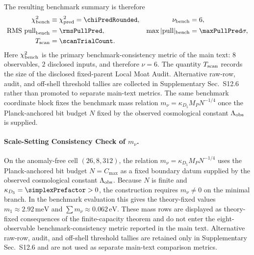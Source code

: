 \documentclass[11pt]{article}
\begin{document}
The resulting benchmark summary is therefore
\begin{align}
 \chi_{\rm bench}^2&\equiv\chi_{\rm pred}^2=\chiPredRounded,
 &\nu_{\rm bench}&=6, \\
 \mathrm{RMS\ pull}_{\rm bench}&=\rmsPullPred,
 &\max |\mathrm{pull}|_{\rm bench}&=\maxPullPred\sigma, \\
 T_{\rm scan}&=\scanTrialCount.
\end{align}
Here $\chi_{\rm bench}^2$ is the primary benchmark-consistency metric of the main text: $8$ observables, $2$ disclosed inputs, and therefore $\nu=6$. The quantity $T_{\rm scan}$ records the size of the disclosed fixed-parent Local Moat Audit. Alternative raw-row, audit, and off-shell threshold tallies are collected in Supplementary Sec.~S12.6 rather than promoted to separate main-text metrics.
The same benchmark coordinate block fixes the benchmark mass relation $m_\nu=\kappa_{D_5}M_PN^{-1/4}$ once the Planck-anchored bit budget $N$ fixed by the observed cosmological constant $\Lambda_{\rm obs}$ is supplied.

\paragraph{Scale-Setting Consistency Check of $m_\nu$.} On the anomaly-free cell $(26,8,312)$, the relation $m_\nu=\kappa_{D_5}M_PN^{-1/4}$ uses the Planck-anchored bit budget $N=C_{\max}$ as a fixed boundary datum supplied by the observed cosmological constant $\Lambda_{\rm obs}$. Because $N$ is finite and $\kappa_{D_5}=\simplexPrefactor>0$, the construction requires $m_\nu\neq0$ on the minimal branch. In the benchmark evaluation this gives the theory-fixed values $m_1\approx2.92\,\mathrm{meV}$ and $\sum m_\nu\approx0.062\,\mathrm{eV}$. These mass rows are displayed as theory-fixed consequences of the finite-capacity theorem and do not enter the eight-observable benchmark-consistency metric reported in the main text.
Alternative raw-row, audit, and off-shell threshold tallies are retained only in Supplementary Sec.~S12.6 and are not used as separate main-text comparison metrics.
\end{document}
